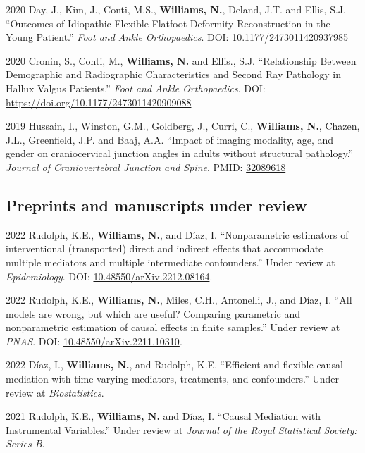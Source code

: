 \documentclass[12pt,letterpaper]{report}
\begin{document}
\begin{tablist}
	\item[2020] \tab Day, J., Kim, J., Conti, M.S., \textbf{Williams, N.}, Deland, J.T. and Ellis, S.J. \enquote{Outcomes of Idiopathic Flexible Flatfoot Deformity Reconstruction in the Young Patient.} \textit{Foot and Ankle Orthopaedics}. DOI: \href{https://doi.org/10.1177/2473011420937985}{10.1177/2473011420937985}
	
	\item[2020] \tab Cronin, S., Conti, M., \textbf{Williams, N.} and Ellis., S.J. \enquote{Relationship Between Demographic and Radiographic Characteristics and Second Ray Pathology in Hallux Valgus Patients.} \textit{Foot and Ankle Orthopaedics}. DOI: \href{https://doi.org/10.1177/2473011420909088}{https://doi.org/10.1177/2473011420909088}

	\item[2019] \tab Hussain, I., Winston, G.M., Goldberg, J., Curri, C., \textbf{Williams, N.}, Chazen, J.L., Greenfield, J.P. and Baaj, A.A. \enquote{Impact of imaging modality, age, and gender on craniocervical junction angles in adults without structural pathology.} \textit{Journal of Craniovertebral Junction and Spine}. PMID: \href{https://www.ncbi.nlm.nih.gov/pubmed/32089618}{32089618}

    \end{tablist}
    
    \subsection*{Preprints and manuscripts under review}
    
    \begin{tablist}
    
    \item[2022] \tab Rudolph, K.E., \textbf{Williams, N.}, and Díaz, I. \enquote{Nonparametric estimators of interventional (transported) direct and indirect effects that accommodate multiple mediators and multiple intermediate confounders.} Under review at \textit{Epidemiology}. DOI: \href{https://doi.org/10.48550/arXiv.2212.08164}{10.48550/arXiv.2212.08164}.
    
    \item[2022] \tab Rudolph, K.E., \textbf{Williams, N.}, Miles, C.H., Antonelli, J., and Díaz, I. \enquote{All models are wrong, but which are useful? Comparing parametric and nonparametric estimation of causal effects in finite samples.} Under review at \textit{PNAS}. DOI: \href{https://doi.org/10.48550/arXiv.2211.10310}{10.48550/arXiv.2211.10310}.
    
    \item[2022] \tab Díaz, I., \textbf{Williams, N.}, and Rudolph, K.E. \enquote{Efficient and flexible causal mediation with time-varying mediators, treatments, and confounders.} Under review at \textit{Biostatistics}.
    
    \item[2021] \tab Rudolph, K.E., \textbf{Williams, N.} and Díaz, I. \enquote{Causal Mediation with Instrumental Variables.} Under review at \textit{Journal of the Royal Statistical Society: Series B}.
    
    \end{tablist}
\end{document}
